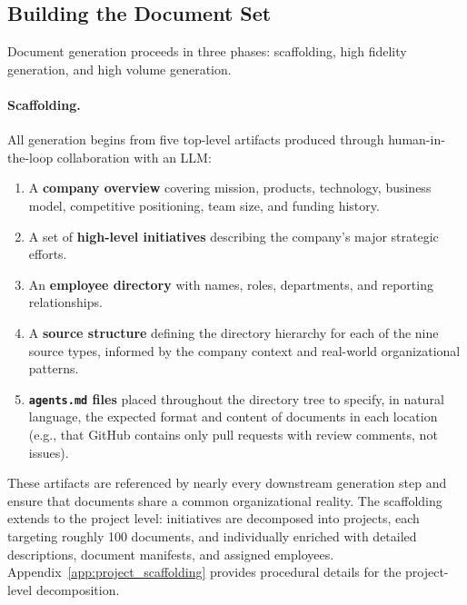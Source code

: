 \documentclass{article}
\begin{document}
\subsection{Building the Document Set}
\label{sec:building}

Document generation proceeds in three phases: scaffolding, high fidelity generation, and high volume generation.

\paragraph{Scaffolding.}
All generation begins from five top-level artifacts produced through human-in-the-loop collaboration with an LLM:

\begin{enumerate}[leftmargin=2em]
  \item A \textbf{company overview} covering mission, products, technology, business model, competitive positioning, team size, and funding history.
  \item A set of \textbf{high-level initiatives} describing the company's major strategic efforts.
  \item An \textbf{employee directory} with names, roles, departments, and reporting relationships.
  \item A \textbf{source structure} defining the directory hierarchy for each of the nine source types, informed by the company context and real-world organizational patterns.
  \item \textbf{\texttt{agents.md} files} placed throughout the directory tree to specify, in natural language, the expected format and content of documents in each location (e.g., that GitHub contains only pull requests with review comments, not issues).
\end{enumerate}

These artifacts are referenced by nearly every downstream generation step and ensure that documents share a common organizational reality. The scaffolding extends to the project level: initiatives are decomposed into projects, each targeting roughly 100 documents, and individually enriched with detailed descriptions, document manifests, and assigned employees. Appendix~\ref{app:project_scaffolding} provides procedural details for the project-level decomposition.
\end{document}
